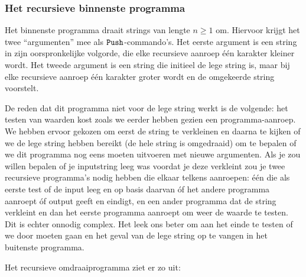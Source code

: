 \subsubsection{Het recursieve binnenste programma}
Het binnenste programma draait strings van lengte $n\ge1$ om. Hiervoor krijgt het
twee ``argumenten'' mee als $\texttt{Push}$-commando's. Het eerste argument is een string in zijn
oorspronkelijke volgorde, die elke recursieve aanroep \'{e}\'{e}n karakter
kleiner wordt. Het tweede argument is een string die initieel de lege
string is, maar bij elke recursieve aanroep \'{e}\'{e}n karakter groter wordt
en de omgekeerde string voorstelt.

De reden dat dit programma niet voor de lege string werkt is de volgende: het
testen van waarden kost zoals we eerder hebben gezien een programma-aanroep. We
hebben ervoor gekozen om eerst de string te verkleinen en daarna te kijken of
we de lege string hebben bereikt (de hele string is omgedraaid) om te bepalen
of we dit programma nog eens moeten uitvoeren met nieuwe argumenten. Als je zou
willen bepalen of je inputstring leeg was voordat je deze verkleint zou je twee
recursieve programma's nodig hebben die elkaar telkens aanroepen: \'{e}\'{e}n
die als eerste test of de input leeg en op basis daarvan \'{o}f het andere
programma aanroept \'{o}f output geeft en eindigt, en een ander programma dat
de string verkleint en dan het eerste programma aanroept om weer de waarde te
testen. Dit is echter onnodig complex. Het leek ons beter om aan het einde te
testen of we door moeten gaan en het geval van de lege string op te vangen in
het buitenste programma.

Het recursieve omdraaiprogramma ziet er zo uit:

